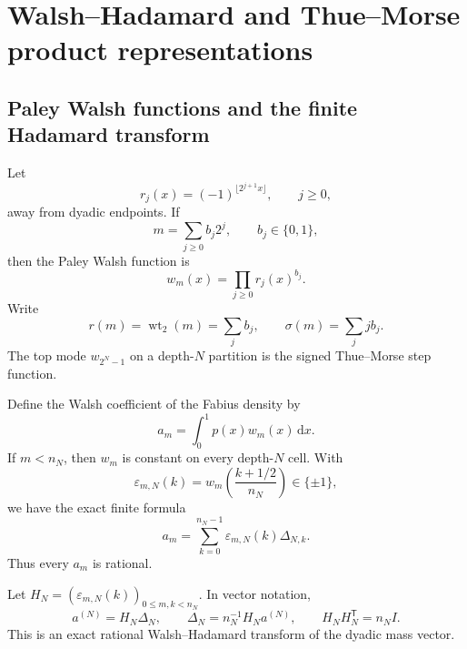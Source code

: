 \documentclass[11pt,oneside]{article}
\theoremstyle{definition}
\theoremstyle{remark}
\newcommand{\wt}{\operatorname{wt}_2}
\newcommand{\dd}{\,\mathrm d}
\begin{document}
\section{Walsh--Hadamard and Thue--Morse product representations}
\label{sec:walsh}

\subsection{Paley Walsh functions and the finite Hadamard transform}

Let
\begin{equation}\label{eq:Rademacher}
 r_j(x)=(-1)^{\lfloor2^{j+1}x\rfloor},
 \qquad j\ge0,
\end{equation}
away from dyadic endpoints.  If
\begin{equation}\label{eq:m-bits}
 m=\sum_{j\ge0}b_j2^j,
 \qquad b_j\in\{0,1\},
\end{equation}
then the Paley Walsh function is
\begin{equation}\label{eq:Walsh-def}
 w_m(x)=\prod_{j\ge0}r_j(x)^{b_j}.
\end{equation}
Write
\begin{equation}\label{eq:weight-sigma}
 r(m)=\wt(m)=\sum_jb_j,
 \qquad
 \sigma(m)=\sum_jj b_j.
\end{equation}
The top mode $w_{2^N-1}$ on a depth-$N$ partition is the signed
Thue--Morse step function.

Define the Walsh coefficient of the Fabius density by
\begin{equation}\label{eq:a_m-def}
 a_m=\int_0^1p(x)w_m(x)\dd x.
\end{equation}
If $m<n_N$, then $w_m$ is constant on every depth-$N$ cell.  With
\begin{equation}\label{eq:epsilon-mNk}
 \varepsilon_{m,N}(k)=w_m\!\left(\frac{k+1/2}{n_N}\right)\in\{\pm1\},
\end{equation}
we have the exact finite formula
\begin{equation}\label{eq:a-Hadamard-masses}
 a_m=\sum_{k=0}^{n_N-1}\varepsilon_{m,N}(k)\Delta_{N,k}.
\end{equation}
Thus every $a_m$ is rational.

Let $H_N=(\varepsilon_{m,N}(k))_{0\le m,k<n_N}$.  In vector notation,
\begin{equation}\label{eq:Hadamard-pair}
 a^{(N)}=H_N\Delta_N,
 \qquad
 \Delta_N=n_N^{-1}H_Na^{(N)},
 \qquad H_NH_N^{\mathsf T}=n_NI.
\end{equation}
This is an exact rational Walsh--Hadamard transform of the dyadic mass vector.
\end{document}
